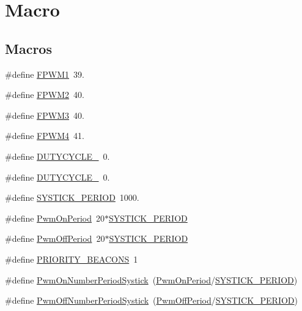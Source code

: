 \hypertarget{group__beacon_signal___macro}{\section{Macro}
\label{group__beacon_signal___macro}
}
\subsection*{Macros}
\begin{DoxyCompactItemize}
\item 
\#define \hyperlink{group__beacon_signal___macro_ga49376f249aeca65c4a534dbc8afdf4cd}{F\+P\+W\+M1}~39.
\item 
\#define \hyperlink{group__beacon_signal___macro_gad4b2ed9e61715e40bbab12d10d8182e9}{F\+P\+W\+M2}~40.
\item 
\#define \hyperlink{group__beacon_signal___macro_ga463b5670a5e6079824d642fb58831e3d}{F\+P\+W\+M3}~40.
\item 
\#define \hyperlink{group__beacon_signal___macro_gaaa94e02e49348091ccf2d3e22ab2d182}{F\+P\+W\+M4}~41.
\item 
\#define \hyperlink{group__beacon_signal___macro_ga9d871143d27f7b01c887609eb96d7b71}{D\+U\+T\+Y\+C\+Y\+C\+L\+E\+\_}~0.
\item 
\#define \hyperlink{group__beacon_signal___macro_ga97d7361385c99d61f06a2b5d9135a2c2}{D\+U\+T\+Y\+C\+Y\+C\+L\+E\+\_}~0.
\item 
\#define \hyperlink{group__beacon_signal___macro_gac4be368d2c41160d8e870a97f343a526}{S\+Y\+S\+T\+I\+C\+K\+\_\+\+P\+E\+R\+I\+O\+D}~1000.
\item 
\#define \hyperlink{group__beacon_signal___macro_gaa4b55d09127eed549270564a95b26827}{Pwm\+On\+Period}~20$\ast$\hyperlink{group__beacon_signal___macro_gac4be368d2c41160d8e870a97f343a526}{S\+Y\+S\+T\+I\+C\+K\+\_\+\+P\+E\+R\+I\+O\+D}
\item 
\#define \hyperlink{group__beacon_signal___macro_ga9fa466e88ff831cc8a2cbcf68f153dd5}{Pwm\+Off\+Period}~20$\ast$\hyperlink{group__beacon_signal___macro_gac4be368d2c41160d8e870a97f343a526}{S\+Y\+S\+T\+I\+C\+K\+\_\+\+P\+E\+R\+I\+O\+D}
\item 
\#define \hyperlink{group__beacon_signal___macro_ga1ffb3dcd8bce37755a7ef4a7b5f06e35}{P\+R\+I\+O\+R\+I\+T\+Y\+\_\+\+B\+E\+A\+C\+O\+N\+S}~1
\item 
\#define \hyperlink{group__beacon_signal___macro_ga418c8710f670cbacd5b8eb429481f532}{Pwm\+On\+Number\+Period\+Systick}~(\hyperlink{group__beacon_signal___macro_gaa4b55d09127eed549270564a95b26827}{Pwm\+On\+Period}/\hyperlink{group__beacon_signal___macro_gac4be368d2c41160d8e870a97f343a526}{S\+Y\+S\+T\+I\+C\+K\+\_\+\+P\+E\+R\+I\+O\+D})
\item 
\#define \hyperlink{group__beacon_signal___macro_ga0b93440feb629d65e8fa2efc5c85721d}{Pwm\+Off\+Number\+Period\+Systick}~(\hyperlink{group__beacon_signal___macro_ga9fa466e88ff831cc8a2cbcf68f153dd5}{Pwm\+Off\+Period}/\hyperlink{group__beacon_signal___macro_gac4be368d2c41160d8e870a97f343a526}{S\+Y\+S\+T\+I\+C\+K\+\_\+\+P\+E\+R\+I\+O\+D})
\end{DoxyCompactItemize}


